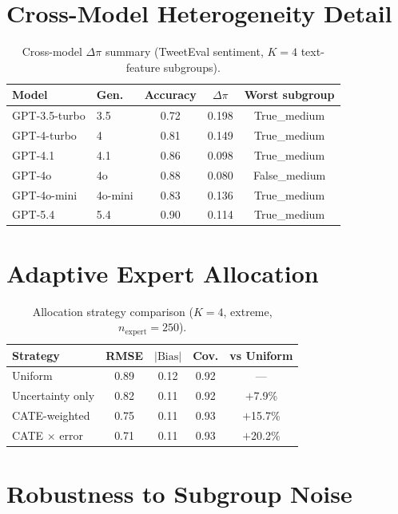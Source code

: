 \documentclass[11pt,a4paper]{article}
\newcommand{\DeltaPi}{\Delta\pi}
\begin{document}
\section{Cross-Model Heterogeneity Detail}\label{app:crossmodel}

\begin{table}[h]
\centering
\small
\caption{Cross-model $\DeltaPi$ summary (TweetEval sentiment, $K=4$ text-feature subgroups).}
\label{tab:crossmodel}
\begin{tabular}{@{}llccc@{}}
\toprule
Model & Gen. & Accuracy & $\DeltaPi$ & Worst subgroup \\
\midrule
GPT-3.5-turbo & 3.5 & 0.72 & 0.198 & True\_medium \\
GPT-4-turbo & 4 & 0.81 & 0.149 & True\_medium \\
GPT-4.1 & 4.1 & 0.86 & 0.098 & True\_medium \\
GPT-4o & 4o & 0.88 & 0.080 & False\_medium \\
GPT-4o-mini & 4o-mini & 0.83 & 0.136 & True\_medium \\
GPT-5.4 & 5.4 & 0.90 & 0.114 & True\_medium \\
\bottomrule
\end{tabular}
\end{table}


\section{Adaptive Expert Allocation}\label{app:allocation}

\begin{table}[h]
\centering
\small
\caption{Allocation strategy comparison ($K=4$, extreme, $n_{\text{expert}}=250$).}
\label{tab:allocation}
\begin{tabular}{@{}lcccc@{}}
\toprule
Strategy & RMSE & $|\text{Bias}|$ & Cov. & vs Uniform \\
\midrule
Uniform & 0.89 & 0.12 & 0.92 & --- \\
Uncertainty only & 0.82 & 0.11 & 0.92 & $+$7.9\% \\
CATE-weighted & 0.75 & 0.11 & 0.93 & $+$15.7\% \\
CATE $\times$ error & 0.71 & 0.11 & 0.93 & $+$20.2\% \\
\bottomrule
\end{tabular}
\end{table}


\section{Robustness to Subgroup Noise}\label{app:robustness}
\end{document}
